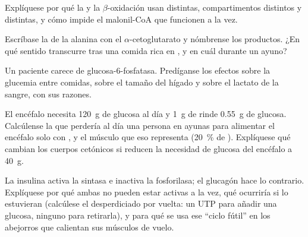 \begin{exercise}[$\star\star$]\label{exo:b1:biosyntheses-integration:7}
Explíquese por qué la  y la $\beta$-oxidación usan
 distintas, compartimentos distintos y  distintas, y cómo
impide el malonil-CoA que funcionen a la vez.
\end{exercise}

\begin{exercise}[$\star\star$]\label{exo:b1:biosyntheses-integration:8}
Escríbase la  de la alanina con el $\alpha$-cetoglutarato y
nómbrense los productos. ¿En qué sentido transcurre tras una comida rica en
, y en cuál durante un ayuno?
\end{exercise}

\begin{exercise}[$\star\star$]\label{exo:b1:biosyntheses-integration:9}
Un paciente carece de glucosa-6-fosfatasa. Predíganse los efectos sobre la
glucemia entre comidas, sobre el tamaño del hígado y sobre el lactato de la
sangre, con sus razones.
\end{exercise}

\begin{exercise}[$\star\star\star$]\label{exo:b1:biosyntheses-integration:10}
El encéfalo necesita \qty{120}{g} de glucosa al día y \qty{1}{g} de 
rinde \qty{0.55}{g} de glucosa. Calcúlense la  que perdería al día
una persona en ayunas para alimentar el encéfalo solo con , y
el músculo que eso representa (\qty{20}{\%} de ). Explíquese qué
cambian los cuerpos cetónicos si reducen la necesidad de glucosa del
encéfalo a \qty{40}{g}.
\end{exercise}

\begin{exercise}[$\star\star\star$]\label{exo:b1:biosyntheses-integration:11}
La insulina activa la  sintasa e inactiva la  fosforilasa;
el glucagón hace lo contrario. Explíquese por qué ambas no pueden estar
activas a la vez, qué ocurriría si lo estuvieran (calcúlese el 
desperdiciado por vuelta: un UTP para añadir una glucosa, ninguno para
retirarla), y para qué se usa ese ``ciclo fútil'' en los abejorros que
calientan sus músculos de vuelo.
\end{exercise}

